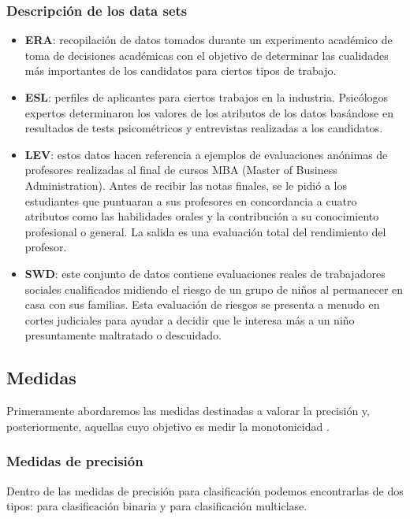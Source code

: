 \subsubsection{Descripción de los data sets}

\begin{itemize}
	\item \textbf{ERA}: recopilación de datos tomados durante un experimento académico de toma de decisiones académicas con el objetivo de determinar las cualidades más importantes  de los candidatos para ciertos tipos de trabajo.
	\item \textbf{ESL}: perfiles de aplicantes para ciertos trabajos en la industria. Psicólogos expertos determinaron los valores de los atributos de los datos basándose en resultados de tests psicométricos y entrevistas realizadas a los candidatos.
	\item \textbf{LEV}: estos datos hacen referencia a ejemplos de evaluaciones anónimas de profesores realizadas al final de cursos MBA (Master of Business Administration). Antes de recibir las notas finales, se le pidió a los estudiantes que puntuaran a sus profesores en concordancia a cuatro atributos como las habilidades orales y la contribución a su conocimiento profesional o general. La salida es una evaluación total del rendimiento del profesor.
	\item \textbf{SWD}: este conjunto de datos contiene evaluaciones reales de trabajadores sociales cualificados midiendo el riesgo de un grupo de niños al permanecer en casa con sus familias. Esta evaluación de riesgos se presenta a menudo en cortes judiciales para ayudar a decidir que le interesa más a un niño presuntamente maltratado o descuidado.
\end{itemize}



\subsection{Medidas}

Primeramente abordaremos las medidas destinadas a valorar la precisión y, posteriormente, aquellas cuyo objetivo es medir la monotonicidad \cite{ref15}.

\subsubsection{Medidas de precisión}

Dentro de las medidas de precisión para clasificación podemos encontrarlas de dos tipos: para clasificación binaria y para clasificación multiclase.

